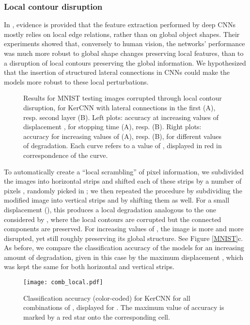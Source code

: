 \documentclass[11pt,oneside,reqno]{amsart}
\renewcommand{\baselinestretch}{1.5} \interfootnotelinepenalty=10000
\begin{document}
 
 \subsubsection{Local contour disruption} 
 In \citet{baker}, evidence is provided that the feature extraction performed by deep CNNs mostly relies on local edge relations, rather than on global object shapes. Their experiments showed that, conversely to human vision, the networks' performance was much more robust to global shape changes preserving local features, than to a disruption of local contours preserving the global information. We hypothesized that the insertion of structured lateral connections in CNNs could make the models more robust to these local perturbations.\\ 
 \begin{figure}[htbp!]
 \centering
 {\renewcommand{\baselinestretch}{0}
 \;
 }
 \caption{Results for MNIST testing images corrupted through local contour disruption, for KerCNN with lateral connections in the first (A), resp. second layer (B). Left plots: accuracy at increasing values of displacement , for stopping time  (A), resp.  (B). Right plots: accuracy for increasing values of  (A), resp.  (B), for different values of degradation. Each curve refers to a value of , displayed in red in correspondence of the curve.}\label{local}
 \end{figure}
 To automatically create a ``local scrambling'' of pixel information, we subdivided the images into horizontal strips and shifted each of these strips by a number of pixels , randomly picked in ; we then repeated the procedure by subdividing the modified image into vertical strips and by shifting them as well. For a small displacement (), this produces a local degradation analogous to the one considered by \citet{baker}, where the local contours are corrupted but the connected components are preserved. For increasing values of , the image is more and more disrupted, yet still roughly preserving its global structure. See Figure \ref{MNIST}c. As before, we compare the classification accuracy of the models for an increasing amount of degradation, given in this case by the maximum displacement , which was kept the same for both horizontal and vertical strips. 
 \begin{figure}[htbp!]
  \centering
 \texttt{[image: comb\_local.pdf]}
 \caption{Classification accuracy (color-coded) for KerCNN for all combinations of , displayed for . The maximum value of accuracy is marked by a red star onto the corresponding cell.}\label{comb_local}
 \end{figure}
\end{document}
